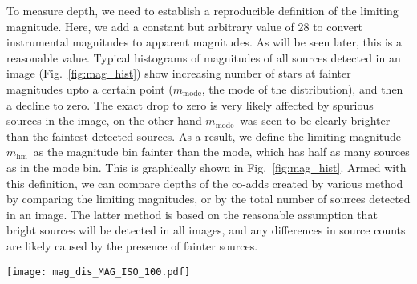 \documentclass[fleqn,usenatbib]{mnras}
\newcommand{\mmode}{\ensuremath{m_\mathrm{mode}}}
\newcommand{\mlim}{\ensuremath{m_\mathrm{lim}}}
\begin{document}
To measure depth, we need to establish a reproducible definition of the limiting magnitude. Here, we add a constant but arbitrary value of 28 to convert instrumental magnitudes to apparent magnitudes. As will be seen later, this is a reasonable value. Typical histograms of magnitudes of all sources detected in an image (Fig.~\ref{fig:mag_hist}) show increasing number of stars at fainter magnitudes upto a certain point (\mmode, the mode of the distribution), and then a decline to zero. The exact drop to zero is very likely affected by spurious sources in the image, on the other hand \mmode\ was seen to be clearly brighter than the faintest detected sources. As a result, we define the limiting magnitude \mlim\ as the magnitude bin fainter than the mode, which has half as many sources as in the mode bin. This is graphically shown in Fig.~\ref{fig:mag_hist}. Armed with this definition, we can compare depths of the co-adds created by various method by comparing the limiting magnitudes, or by the total number of sources detected in an image. The latter method is based on the reasonable assumption that bright sources will be detected in all images, and any differences in source counts are likely caused by the presence of fainter sources.


\begin{figure*}
\texttt{[image: mag\_dis\_MAG\_ISO\_100.pdf]}\\
\caption{Histograms of source magnitudes in the final co-added images for one set, using the four co-addition methods. 
We used SExtractor isophotal magnitudes (MAG\_ISO) and added an arbitrary but constant zero point of 28 to the instrumental magnitudes.
Vertical dot-dashed lines show the mode magnitude (\mmode) and the limiting magnitude (\mlim). The horizontal dashed lines mark half the number of sources as the histogram mode, and \mlim\ can be read off as the first bin below the rightmost intersection of this line with the histogram. 
x-axis needs label. ($V_{CSS}$)
}
\label{fig:mag_hist}
\end{figure*}
\end{document}
